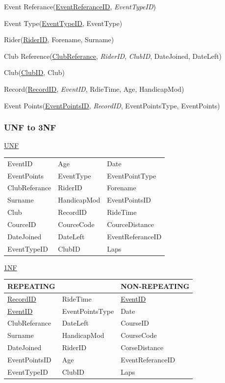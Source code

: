Event Referance(\underline{EventReferanceID}, \emph{EventTypeID})

Event Type(\underline{EventTypeID}, EventType)

Rider(\underline{RiderID}, Forename, Surname)

Club Reference(\underline{ClubReferance}, \emph{RiderID}, \emph{ClubID}, DateJoined, DateLeft)

Club(\underline{ClubID}, Club)

Record(\underline{RecordID}, \emph{EventID}, RdieTime, Age, HandicapMod)

Event Points(\underline{EventPointsID}, \emph{RecordID}, EventPointsType, EventPoints)

\subsubsection{UNF to 3NF}
\underline{UNF}


\begin{tabular}{l l l}
EventID        & Age              & Date               \\
EventPoints    & EventType        & EventPointType     \\
ClubReferance  & RiderID          & Forename           \\
Surname        & HandicapMod      & EventPointsID      \\
Club           & RecordID         & RideTime           \\
CourceID       & CourceCode       & CourceDistance     \\
DateJoined     & DateLeft         & EventReferanceID   \\
EventTypeID    & ClubID           & Laps               \\

\end{tabular}

\underline{1NF}

\begin{tabular}{|l l|l|}
\hline
REPEATING           &                 & NON-REPEATING       \\ \hline
\underline{RecordID}& RideTime        & \underline{EventID} \\ \hline
\underline{EventID} & EventPointsType & Date                \\ \hline
ClubReferance       & DateLeft        & CourseID            \\ \hline
Surname             & HandicapMod     & CourseCode          \\ \hline
DateJoined          & RiderID         & CorseDistance       \\ \hline 
EventPointsID       & Age             & EventReferanceID    \\ \hline
EventTypeID         & ClubID          & Laps                \\ \hline
\end{tabular}




